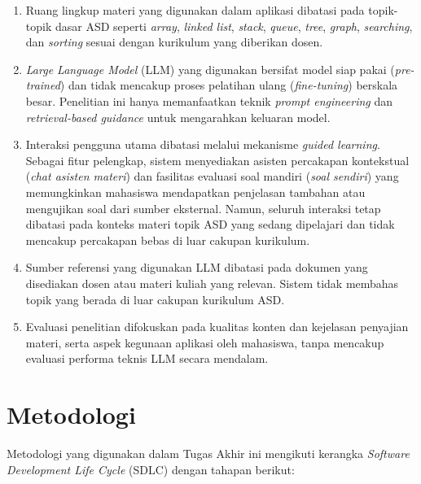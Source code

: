 \begin{enumerate}
    \item Ruang lingkup materi yang digunakan dalam aplikasi dibatasi pada topik-topik dasar ASD seperti \textit{array}, \textit{linked list}, \textit{stack}, \textit{queue}, \textit{tree}, \textit{graph}, \textit{searching}, dan \textit{sorting} sesuai dengan kurikulum yang diberikan dosen.
    \item \textit{Large Language Model} (LLM) yang digunakan bersifat model siap pakai (\textit{pre-trained}) dan tidak mencakup proses pelatihan ulang (\textit{fine-tuning}) berskala besar. Penelitian ini hanya memanfaatkan teknik \textit{prompt engineering} dan \textit{retrieval-based guidance} untuk mengarahkan keluaran model.
    \item Interaksi pengguna utama dibatasi melalui mekanisme \textit{guided learning}. Sebagai fitur pelengkap, sistem menyediakan asisten percakapan kontekstual (\textit{chat asisten materi}) dan fasilitas evaluasi soal mandiri (\textit{soal sendiri}) yang memungkinkan mahasiswa mendapatkan penjelasan tambahan atau mengujikan soal dari sumber eksternal. Namun, seluruh interaksi tetap dibatasi pada konteks materi topik ASD yang sedang dipelajari dan tidak mencakup percakapan bebas di luar cakupan kurikulum.
    \item Sumber referensi yang digunakan LLM dibatasi pada dokumen yang disediakan dosen atau materi kuliah yang relevan. Sistem tidak membahas topik yang berada di luar cakupan kurikulum ASD.
    \item Evaluasi penelitian difokuskan pada kualitas konten dan kejelasan penyajian materi, serta aspek kegunaan aplikasi oleh mahasiswa, tanpa mencakup evaluasi performa teknis LLM secara mendalam.
\end{enumerate}

\section{Metodologi}
Metodologi yang digunakan dalam Tugas Akhir ini mengikuti kerangka \textit{Software Development Life Cycle} (SDLC) dengan tahapan berikut:


